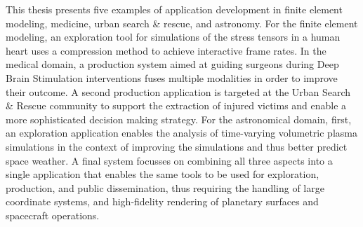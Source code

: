 This thesis presents five examples of application development in finite element modeling, medicine, urban search \& rescue, and astronomy.  For the finite element modeling, an exploration tool for simulations of the stress tensors in a human heart uses a compression method to achieve interactive frame rates.  In the medical domain, a production system aimed at guiding surgeons during Deep Brain Stimulation interventions fuses multiple modalities in order to improve their outcome.  A second production application is targeted at the Urban Search \& Rescue community to support the extraction of injured victims and enable a more sophisticated decision making strategy.  For the astronomical domain, first, an exploration application enables the analysis of time-varying volumetric plasma simulations in the context of improving the simulations and thus better predict space weather.  A final system focusses on combining all three aspects into a single application that enables the same tools to be used for exploration, production, and public dissemination, thus requiring the handling of large coordinate systems, and high-fidelity rendering of planetary surfaces and spacecraft operations.
